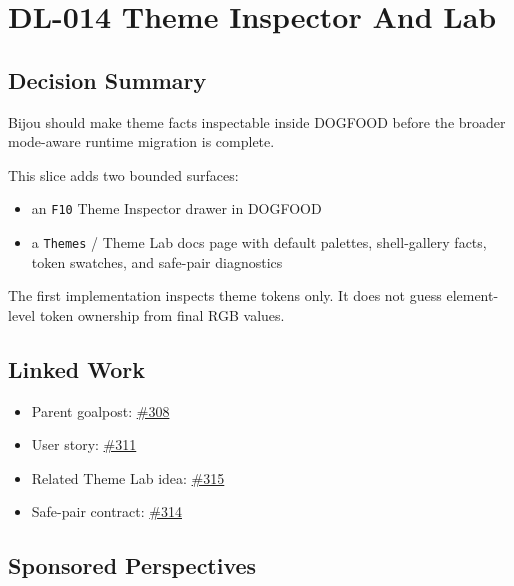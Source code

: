 \chapter{DL-014 Theme Inspector And Lab}\label{record-179}

\smallskip

\section{Decision Summary}\label{record-179-decision-summary}

Bijou should make theme facts inspectable inside DOGFOOD before the broader mode-aware runtime migration is complete.

This slice adds two bounded surfaces:

\begin{itemize}
\tightlist
\item
  an \texttt{F\allowbreak{}1\allowbreak{}0} Theme Inspector drawer in DOGFOOD
\item
  a \texttt{T\allowbreak{}h\allowbreak{}e\allowbreak{}m\allowbreak{}e\allowbreak{}s} / Theme Lab docs page with default palettes, shell-gallery facts, token swatches, and safe-pair diagnostics
\end{itemize}

The first implementation inspects theme tokens only. It does not guess element-level token ownership from final RGB values.

\section{Linked Work}\label{record-179-linked-work}

\begin{itemize}
\tightlist
\item
  Parent goalpost: \href{https://github.com/flyingrobots/bijou/issues/308}{\#308}
\item
  User story: \href{https://github.com/flyingrobots/bijou/issues/311}{\#311}
\item
  Related Theme Lab idea: \href{https://github.com/flyingrobots/bijou/issues/315}{\#315}
\item
  Safe-pair contract: \href{https://github.com/flyingrobots/bijou/issues/314}{\#314}
\end{itemize}

\section{Sponsored Perspectives}\label{record-179-sponsored-perspectives}

